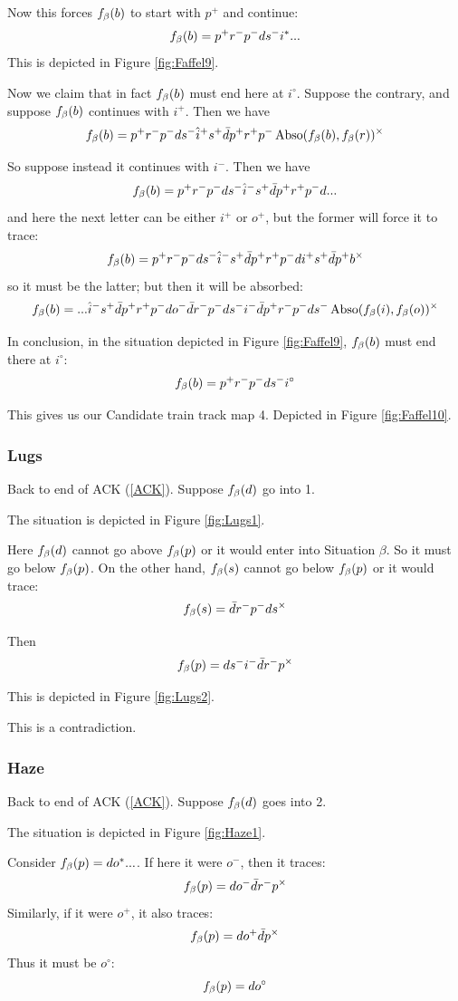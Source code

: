 Now this forces $f_\beta(b)$ to start with $p^+$ and continue:
\[
f_\beta(b) = p^+ r^- p^- d s^- i^*...
\]
This is depicted in Figure \ref{fig:Faffel9}.

Now we claim that in fact $f_\beta(b)$ must end here at $i^\circ$. Suppose the contrary, and suppose $f_\beta(b)$ continues with $i^+$. Then we have
\[
f_\beta(b) = p^+ r^- p^- d s^- \hat{i}^+ s^+ \bar{d} p^+ r^+ p^- \operatorname{Abso}(f_\beta(b), f_\beta(r))^\times
\]

So suppose instead it continues with $i^-$. Then we have
\[
f_\beta(b) = p^+ r^- p^- d s^- \hat{i}^- s^+ \bar{d} p^+ r^+ p^- d...
\]
and here the next letter can be either $i^+$ or $o^+$, but the former will force it to trace:
\[
f_\beta(b) = p^+ r^- p^- d s^- \hat{i}^- s^+ \bar{d} p^+ r^+ p^- d i^+ s^+ \bar{d} p^+ b^\times
\]
so it must be the latter; but then it will be absorbed:
\[
f_\beta(b) = ...\hat{i}^- s^+ \bar{d} p^+ r^+ p^- d o^- \bar{d} r^- p^- d s^- i^- \bar{d} p^+ r^- p^- d s^- \operatorname{Abso}(f_\beta(i), f_\beta(o))^\times
\]

In conclusion, in the situation depicted in Figure \ref{fig:Faffel9}, $f_\beta(b)$ must end there at $i^\circ$:
\[
f_\beta(b) = p^+ r^- p^- d s^- i^\circ
\]

This gives us our Candidate train track map 4. Depicted in Figure \ref{fig:Faffel10}.

\subsubsection{Lugs}\label{Lugs}
Back to end of ACK (\ref{ACK}). Suppose $f_\beta(d)$ go into 1.

The situation is depicted in Figure \ref{fig:Lugs1}. 

Here $f_\beta(d)$ cannot go above $f_\beta(p)$ or it would enter into Situation $\beta$. So it must go below $f_\beta(p)$. On the other hand, $f_\beta(s)$ cannot go below $f_\beta(p)$ or it would trace:
\[
f_\beta(s) = \bar{d} r^- p^- d s^\times
\]

Then
\[
f_\beta(p) = d s^- i^- \bar{d} r^- p^\times
\]

This is depicted in Figure \ref{fig:Lugs2}.

This is a contradiction.

\subsubsection{Haze}\label{Haze}
Back to end of ACK (\ref{ACK}). Suppose $f_\beta(d)$ goes into 2. 

The situation is depicted in Figure \ref{fig:Haze1}. 

Consider $f_\beta(p) = d o^*...$. If here it were $o^-$, then it traces:
\[
f_\beta(p) = d o^- \bar{d} r^- p^\times
\]
Similarly, if it were $o^+$, it also traces:
\[
f_\beta(p) = d o^+ \bar{d} p^\times
\]
Thus it must be $o^\circ$:
\[
f_\beta(p) = d o^\circ
\]

